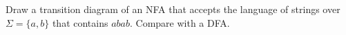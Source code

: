 Draw a transition diagram of an NFA that accepts the language of
strings over $\Sigma = \{a,b\}$ that contains $abab$.
Compare with a DFA.
\vspace{2in}
